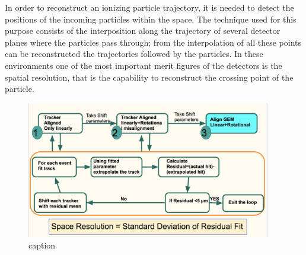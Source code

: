 In order to reconstruct an ionizing particle trajectory, it is needed to detect the positions of the incoming particles within the space. 
The technique used for this purpose consists of the interposition along the trajectory of several detector planes where the particles pass through; from the interpolation of all these points can be reconstructed the trajectories followed by the particles.
In these environments one of the most important merit figures of the detectors is the spatial resolution, that is the capability to reconstruct the crossing point of the particle.
\begin{figure}[htbp]
    \centering
    \includegraphics[width=0.95\textwidth]{figures/GEM/GEM_Alignment_FlowChart.png}
    \caption{caption}
    \label{fig:label}
\end{figure}

